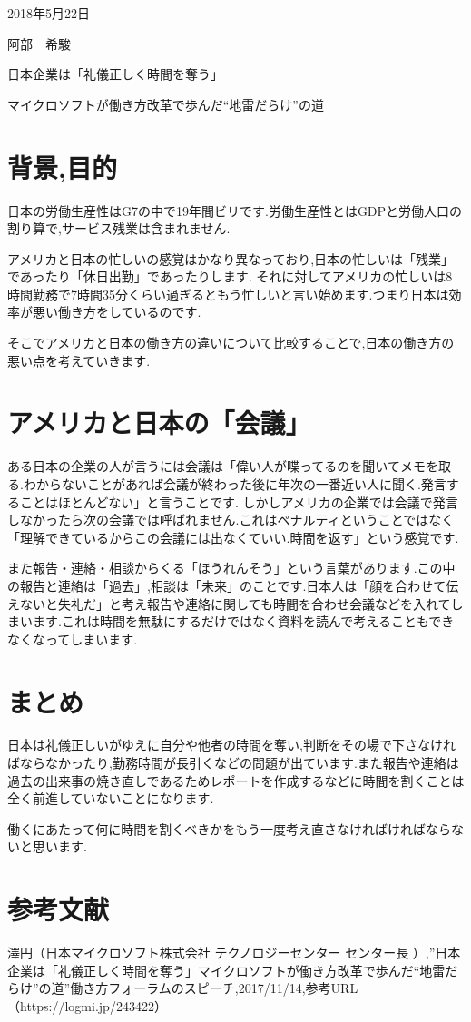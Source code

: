 \documentclass[a4j,11pt]{jsarticle}
\begin{document}
\begin{flushright} 
2018年5月22日%

阿部　希駿
\end{flushright}

\begin{center}
\Large{日本企業は「礼儀正しく時間を奪う」

マイクロソフトが働き方改革で歩んだ“地雷だらけ”の道}%
\end{center}

\section{背景,目的} %
日本の労働生産性はG7の中で19年間ビリです.労働生産性とはGDPと労働人口の割り算で,サービス残業は含まれません.

アメリカと日本の忙しいの感覚はかなり異なっており,日本の忙しいは「残業」であったり「休日出勤」であったりします.
それに対してアメリカの忙しいは8時間勤務で7時間35分くらい過ぎるともう忙しいと言い始めます.つまり日本は効率が悪い働き方をしているのです.

そこでアメリカと日本の働き方の違いについて比較することで,日本の働き方の悪い点を考えていきます.

\section{アメリカと日本の「会議」} 
ある日本の企業の人が言うには会議は「偉い人が喋ってるのを聞いてメモを取る.わからないことがあれば会議が終わった後に年次の一番近い人に聞く.発言することはほとんどない」と言うことです.
しかしアメリカの企業では会議で発言しなかったら次の会議では呼ばれません.これはペナルティということではなく「理解できているからこの会議には出なくていい.時間を返す」という感覚です.

また報告・連絡・相談からくる「ほうれんそう」という言葉があります.この中の報告と連絡は「過去」,相談は「未来」のことです.日本人は「顔を合わせて伝えないと失礼だ」と考え報告や連絡に関しても時間を合わせ会議などを入れてしまいます.これは時間を無駄にするだけではなく資料を読んで考えることもできなくなってしまいます.
\section{まとめ}
日本は礼儀正しいがゆえに自分や他者の時間を奪い,判断をその場で下さなければならなかったり,勤務時間が長引くなどの問題が出ています.また報告や連絡は過去の出来事の焼き直しであるためレポートを作成するなどに時間を割くことは全く前進していないことになります.

働くにあたって何に時間を割くべきかをもう一度考え直さなければければならないと思います.

\section{参考文献}
 澤円（日本マイクロソフト株式会社 テクノロジーセンター センター長 ）,”日本企業は「礼儀正しく時間を奪う」マイクロソフトが働き方改革で歩んだ“地雷だらけ”の道”働き方フォーラムのスピーチ,2017/11/14,参考URL（https://logmi.jp/243422）
\end{document}

